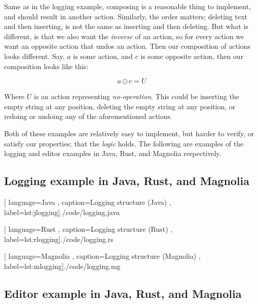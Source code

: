 Same as in the logging example, composing is a reasonable thing to implement,
and should result in another action. Similarly, the order matters; deleting text
and then inserting, is not the same as inserting and then deleting. But what is
different, is that we also want the \textit{inverse} of an action, so for every
action we want an opposite action that undos an action. Then our composition of
actions looks different. Say, $a$ is some action, and $c$ is some opposite
action, then our composition looks like this:

\begin{equation}
  a \odot c = U
\end{equation}

Where $U$ is an action representing \textit{no-operation}. This could be
inserting the empty string at any position, deleting the empty string at any
position, or redoing or undoing any of the aforementioned actions.

Both of these examples are relatively easy to implement, but harder to verify,
or satisfy our properties; that the \textit{logic} holds. The following are
examples of the logging and editor examples in Java, Rust, and Magnolia
respectively.

\subsection{Logging example in Java, Rust, and Magnolia}


\begin{center}
  
    [ language=Java
    , caption={Logging structure (Java)}
    , label=lst:jlogging]{./code/logging.java}
\end{center}

\begin{center}
  
    [ language=Rust
    , caption={Logging structure (Rust)}
    , label=lst:rlogging]{./code/logging.rs}
\end{center}

\begin{center}
  
    [ language=Magnolia
    , caption={Logging structure (Magnolia)}
    , label=lst:mlogging]{./code/logging.mg}
\end{center}

\subsection{Editor example in Java, Rust, and Magnolia}

